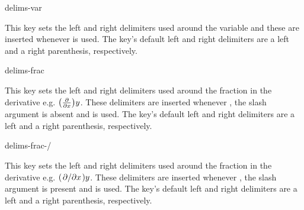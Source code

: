 	\clearpage
	
	\begin{option}{delims-var}
		\begin{values}[default = (~)]
		\end{values}
		This key sets the left and right delimiters used around the variable and these are inserted whenever  is used. The key's default left and right delimiters are a left and a right parenthesis, respectively.
	\end{option}
	
	\begin{option}{delims-frac}
		\begin{values}[default = (~)]
		\end{values}
		This key sets the left and right delimiters used around the fraction in the derivative e.g. $\pdv*[frac=true]{y}{x}$. These delimiters are inserted whenever , the slash argument is absent and  is used. The key's default left and right delimiters are a left and a right parenthesis, respectively.
	\end{option}
	
	\begin{option}{delims-frac-/}
		\begin{values}[default = (~)]
		\end{values}
		This key sets the left and right delimiters used around the fraction in the derivative e.g. $\pdv*[frac=true]{y}/{x}$. These delimiters are inserted whenever , the slash argument is present and  is used. The key's default left and right delimiters are a left and a right parenthesis, respectively.
	\end{option}
	
